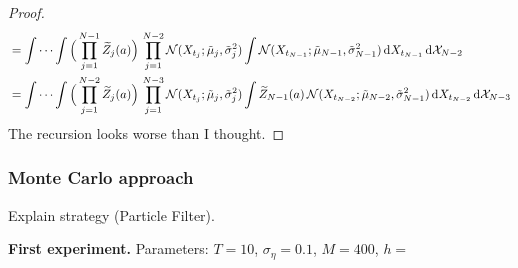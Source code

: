 \documentclass[10pt]{article}
\begin{document}
\begin{proof}
\begin{equation}
\begin{aligned}
		&=  \int \cdots \int \Big(\prod_{j=1}^{N-1} \widetilde Z_j(a)\Big) \,  \prod_{j=1}^{N-2} \mathcal N(X_{t_j}; \tilde \mu_j, \tilde \sigma_j^2) \int \mathcal N(X_{t_{N-1}}; \tilde \mu_{N-1}, \tilde \sigma_{N-1}^2) \, \mathrm{d} X_{t_{N-1}} \, \mathrm{d} \mathcal X_{N-2} \\
		&=  \int \cdots \int \Big(\prod_{j=1}^{N-2} \widetilde Z_j(a)\Big) \,  \prod_{j=1}^{N-3} \mathcal N(X_{t_j}; \tilde \mu_j, \tilde \sigma_j^2) \int \widetilde Z_{N-1}(a) \, \mathcal N(X_{t_{N-2}}; \tilde \mu_{N-2}, \tilde \sigma_{N-1}^2) \, \mathrm{d} X_{t_{N-2}} \, \mathrm{d} \mathcal X_{N-3} \\
	\end{aligned}
	\end{equation}
	{\color{red} The recursion looks worse than I thought.}
\end{proof}

\subsubsection*{Monte Carlo approach}

Explain strategy (Particle Filter).

\textbf{First experiment.} Parameters: $T = 10$, $\sigma_\eta = 0.1$, $M = 400$, $h = $
%
%
\end{document}
